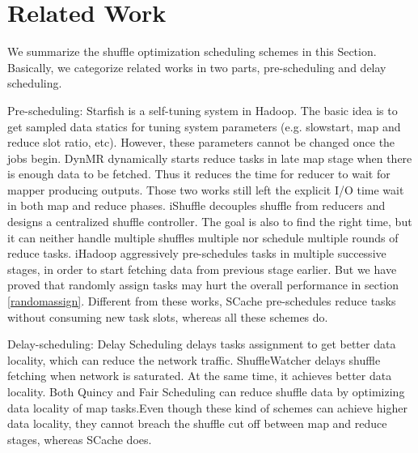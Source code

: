 \section{Related Work}



We summarize the shuffle optimization scheduling schemes in this Section. Basically, we categorize related works in two parts, pre-scheduling and delay scheduling.

Pre-scheduling: Starfish\cite{starfish} is a self-tuning system in Hadoop. The basic idea is to get sampled data statics for tuning system parameters (e.g. slowstart, map and reduce slot ratio, etc). However, these parameters cannot be changed once the jobs begin. DynMR\cite{dynmr} dynamically starts reduce tasks in late map stage when there is enough data to be fetched. Thus it reduces the time for reducer to wait for mapper producing outputs. Those two works still left the explicit I/O time wait in both map and reduce phases. iShuffle\cite{ishuffle} decouples shuffle from reducers and designs a centralized shuffle controller. The goal is also to find the right time, but it can neither handle multiple shuffles multiple nor schedule multiple rounds of reduce tasks. iHadoop\cite{ihadoop} aggressively pre-schedules tasks in multiple successive stages, in order to start fetching data from previous stage earlier. But we have proved that randomly assign tasks may hurt the overall performance in section \ref{randomassign}. Different from these works, SCache pre-schedules reduce tasks without consuming new task slots, whereas all these schemes do.

Delay-scheduling: Delay Scheduling\cite{delay} delays tasks assignment to get better data locality, which can reduce the network traffic. ShuffleWatcher\cite{shufflewatcher} delays shuffle fetching when network is saturated. At the same time, it achieves better data locality. Both Quincy\cite{quincy} and Fair Scheduling\cite{preemptive} can reduce shuffle data by optimizing data locality of map tasks.Even though these kind of schemes can achieve higher data locality, they cannot breach the shuffle cut off between map and reduce stages, whereas SCache does. 